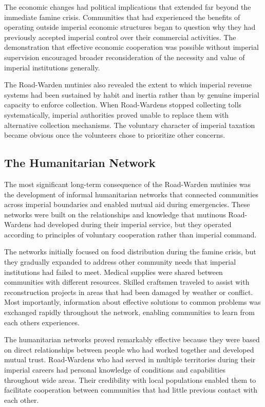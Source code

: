 The economic changes had political implications that extended far beyond
the immediate famine crisis. Communities that had experienced the
benefits of operating outside imperial economic structures began to
question why they had previously accepted imperial control over their
commercial activities. The demonstration that effective economic
cooperation was possible without imperial supervision encouraged broader
reconsideration of the necessity and value of imperial institutions
generally.

The Road-Warden mutinies also revealed the extent to which imperial
revenue systems had been sustained by habit and inertia rather than by
genuine imperial capacity to enforce collection. When Road-Wardens
stopped collecting tolls systematically, imperial authorities proved
unable to replace them with alternative collection mechanisms. The
voluntary character of imperial taxation became obvious once the
volunteers chose to prioritize other concerns.

\subsection{The Humanitarian Network}\label{the-humanitarian-network}

The most significant long-term consequence of the Road-Warden mutinies
was the development of informal humanitarian networks that connected
communities across imperial boundaries and enabled mutual aid during
emergencies. These networks were built on the relationships and
knowledge that mutinous Road-Wardens had developed during their imperial
service, but they operated according to principles of voluntary
cooperation rather than imperial command.

The networks initially focused on food distribution during the famine
crisis, but they gradually expanded to address other community needs
that imperial institutions had failed to meet. Medical supplies were
shared between communities with different resources. Skilled craftsmen
traveled to assist with reconstruction projects in areas that had been
damaged by weather or conflict. Most importantly, information about
effective solutions to common problems was exchanged rapidly throughout
the network, enabling communities to learn from each
other\textquotesingle s experiences.

The humanitarian networks proved remarkably effective because they were
based on direct relationships between people who had worked together and
developed mutual trust. Road-Wardens who had served in multiple
territories during their imperial careers had personal knowledge of
conditions and capabilities throughout wide areas. Their credibility
with local populations enabled them to facilitate cooperation between
communities that had little previous contact with each other.

